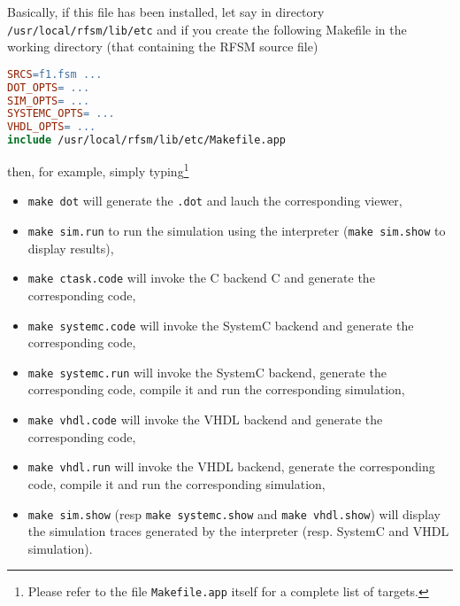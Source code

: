 Basically, if this file has been installed, let say in directory \verb|/usr/local/rfsm/lib/etc|
and if you create the following Makefile in the working directory (that containing the RFSM source
file)

\begin{lstlisting}[language=make,frame=single]
SRCS=f1.fsm ... 
DOT_OPTS= ...
SIM_OPTS= ...
SYSTEMC_OPTS= ...
VHDL_OPTS= ...
include /usr/local/rfsm/lib/etc/Makefile.app
\end{lstlisting}

then, for example, simply typing\footnote{Please refer to the file \texttt{Makefile.app} itself for
  a complete list of targets.}
  \begin{itemize}
  \item \verb|make dot| will generate the \verb|.dot| and lauch the corresponding viewer,
  \item \verb|make sim.run| to run the simulation using the interpreter (\verb|make sim.show| to display results),
  \item \verb|make ctask.code| will invoke the C backend C and generate the corresponding code,
  \item \verb|make systemc.code| will invoke the SystemC backend  and generate the corresponding code,
  \item \verb|make systemc.run| will invoke the SystemC backend, generate the corresponding
    code, compile it and run the corresponding simulation,
  \item \verb|make vhdl.code| will invoke the VHDL backend  and generate the corresponding code,
  \item \verb|make vhdl.run| will invoke the VHDL backend, generate the corresponding
    code, compile it and run the corresponding simulation,
  \item \verb|make sim.show| (resp \verb|make systemc.show| and \verb|make vhdl.show|) will display
    the simulation traces generated by the interpreter (resp. SystemC and VHDL simulation).
  \end{itemize}


